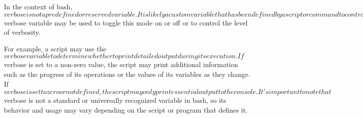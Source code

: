 In the context of bash, $verbose is not a predefined or reserved variable. It is likely a custom variable that has been defined by a script or command to control the level of verbosity or amount of information output by the script or command.

Verbose mode is a common option in command-line interfaces that instructs the program to produce additional output, typically for debugging or diagnostic purposes. The $verbose variable may be used to toggle this mode on or off or to control the level of verbosity.

For example, a script may use the $verbose variable to determine whether to print detailed output during its execution. If $verbose is set to a non-zero value, the script may print additional information such as the progress of its operations or the values of its variables as they change. If $verbose is set to zero or not defined, the script may only print essential output to the console.

It's important to note that $verbose is not a standard or universally recognized variable in bash, so its behavior and usage may vary depending on the script or program that defines it.
